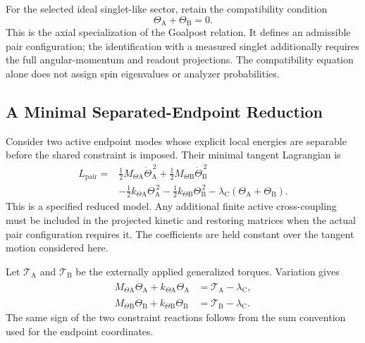 For the selected ideal singlet-like sector, retain the compatibility condition
\begin{equation}
    \boxed{\Theta_{\mathrm A}+\Theta_{\mathrm B}=0}.
\end{equation}
This is the axial specialization of the Goalpost relation. It defines an admissible pair configuration; the identification with a measured singlet additionally requires the full angular-momentum and readout projections. The compatibility equation alone does not assign spin eigenvalues or analyzer probabilities.

\subsection{A Minimal Separated-Endpoint Reduction}

Consider two active endpoint modes whose explicit local energies are separable before the shared constraint is imposed. Their minimal tangent Lagrangian is
\begin{equation}
    \begin{aligned}
    L_{\mathrm{pair}}
    ={}&\frac12M_{\Theta\mathrm A}\dot\Theta_{\mathrm A}^{\,2}
       +\frac12M_{\Theta\mathrm B}\dot\Theta_{\mathrm B}^{\,2}\\
       &-\frac12k_{\Theta\mathrm A}\Theta_{\mathrm A}^{\,2}
       -\frac12k_{\Theta\mathrm B}\Theta_{\mathrm B}^{\,2}
       -\lambda_{\mathrm C}(\Theta_{\mathrm A}+\Theta_{\mathrm B}).
    \end{aligned}
\end{equation}
This is a specified reduced model. Any additional finite active cross-coupling must be included in the projected kinetic and restoring matrices when the actual pair configuration requires it. The coefficients are held constant over the tangent motion considered here.

Let $\mathcal T_{\mathrm A}$ and $\mathcal T_{\mathrm B}$ be the externally applied generalized torques. Variation gives
\begin{align}
    M_{\Theta\mathrm A}\ddot\Theta_{\mathrm A}
    +k_{\Theta\mathrm A}\Theta_{\mathrm A}
    &=\mathcal T_{\mathrm A}-\lambda_{\mathrm C},\\
    M_{\Theta\mathrm B}\ddot\Theta_{\mathrm B}
    +k_{\Theta\mathrm B}\Theta_{\mathrm B}
    &=\mathcal T_{\mathrm B}-\lambda_{\mathrm C}.
\end{align}
The same sign of the two constraint reactions follows from the sum convention used for the endpoint coordinates.

